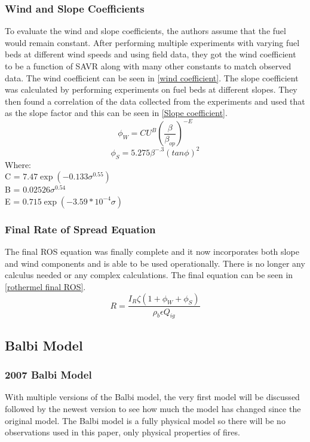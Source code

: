 \documentclass{article}
\begin{document}
\subsubsection{Wind and Slope Coefficients}
\indent To evaluate the wind and slope coefficients, the authors assume that the fuel would remain constant. After performing multiple experiments with varying fuel beds at different wind speeds and using field data, they got the wind coefficient to be a function of SAVR along with many other constants to match observed data. The wind coefficient can be seen in \ref{wind coefficient}. The slope coefficient was calculated by performing experiments on fuel beds at different slopes. They then found a correlation of the data collected from the experiments and used that as the slope factor and this can be seen in \ref{Slope coefficient}.
\begin{equation}
	\label{wind coefficient}
	\phi _ W = C U^{B} (\frac {\beta} {\beta_{op}}) ^ {-E}
\end{equation}
\begin{equation}
	\label{Slope coefficient}
	\phi _ S = 5.275 \beta ^ {-.3} (tan \phi)^{2}
\end{equation}
Where: \\
C = $7.47 \exp(-0.133 \sigma^{0.55})$ \\
B = $0.02526 \sigma^{0.54}$\\
E = $0.715 \exp(-3.59 * 10^{-4} \sigma)$\\
\subsubsection{Final Rate of Spread Equation}
\indent The final ROS equation was finally complete and it now incorporates both slope and wind components and is able to be used operationally. There is no longer any calculus needed or any complex calculations. The final equation can be seen in \ref{rothermel final ROS}. 
\begin{equation}
	\label{rothermel final ROS} 
	R = \frac {I_R \zeta (1 + \phi _ W + \phi _ S )} {\rho _ b \epsilon Q_{ig}}
\end{equation}
\subsection{Balbi Model}
\subsubsection*{2007 Balbi Model}
\indent With multiple versions of the Balbi model, the very first model will be discussed followed by the newest version to see how much the model has changed since the original model. The Balbi model is a fully physical model so there will be no observations used in this paper, only physical properties of fires.
\end{document}
